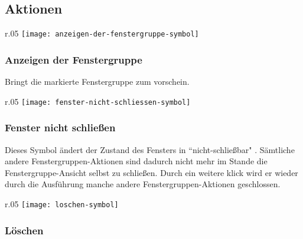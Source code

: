 \subsection{Aktionen}

\begin{wrapfigure}{r}{.05\textwidth}
	\vspace{-14pt}
	\texttt{[image: anzeigen-der-fenstergruppe-symbol]}
	\vspace{-35pt}
\end{wrapfigure}

\subsubsection{Anzeigen der Fenstergruppe}

\vspace{10pt}

Bringt die markierte Fenstergruppe zum vorschein.\\

\begin{wrapfigure}{r}{.05\textwidth}
	\vspace{-14pt}
	\texttt{[image: fenster-nicht-schliessen-symbol]}
	\vspace{-35pt}
\end{wrapfigure}

\subsubsection{Fenster nicht schließen}

\vspace{10pt}

Dieses Symbol ändert der Zustand des Fensters in ``nicht-schließbar" \hspace{1pt}. Sämtliche andere Fenstergruppen-Aktionen sind dadurch nicht mehr im Stande die Fenstergruppe-Ansicht selbst zu schließen. Durch ein weitere klick wird er wieder durch die Ausführung manche andere Fenstergruppen-Aktionen geschlossen.\\

\begin{wrapfigure}{r}{.05\textwidth}
	\vspace{-14pt}
	\texttt{[image: loschen-symbol]}
	\vspace{-35pt}
\end{wrapfigure}

\subsubsection{Löschen}

